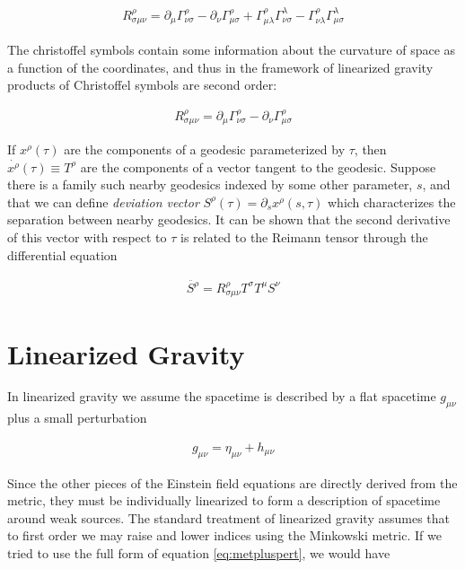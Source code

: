 \begin{align}
R^{\rho}_{\sigma \mu \nu} = \partial_{\mu}\Gamma^{\rho}_{\nu \sigma} - \partial_{\nu}\Gamma^{\rho}_{\mu \sigma} + \Gamma^{\rho}_{\mu \lambda}\Gamma^{\lambda}_{\nu \sigma} - \Gamma^{\rho}_{\nu \lambda}\Gamma^{\lambda}_{\mu \sigma}
\end{align}

The christoffel symbols contain some information about the curvature of space as a function of the coordinates, and thus in the framework of linearized gravity products of Christoffel symbols are second order:   

\begin{align}
R^{\rho}_{\sigma \mu \nu} = \partial_{\mu}\Gamma^{\rho}_{\nu \sigma} - \partial_{\nu}\Gamma^{\rho}_{\mu \sigma} 
\end{align}




If $x^{\rho}(\tau)$ are the components of a geodesic parameterized by $\tau$, then $\dot{x^{\rho}}(\tau) \equiv T^{\rho}$ are the components of a vector tangent to the geodesic. Suppose there is a family such nearby geodesics indexed by some other parameter, $s$, and that we can define \textit{deviation vector} $S^{\rho}(\tau) = \partial_{s}x^{\rho}(s,\tau)$ which characterizes the separation between nearby geodesics. It can be shown that the second derivative of this vector with respect to $\tau$ is related to the Reimann tensor through the differential equation
 

\begin{align}
\ddot{S^{\rho}} = R^{\rho}_{\sigma \mu \nu} T^{\sigma} T^{\mu} S^{\nu}
\end{align} 

\section{Linearized Gravity}

In linearized gravity we assume the spacetime is described by a flat spacetime $g_{\mu \nu}$ plus a small perturbation

\begin{align}\label{eq:metpluspert}
g_{\mu \nu} = \eta_{\mu \nu} + h_{\mu \nu}
\end{align}

Since the other pieces of the Einstein field equations are directly derived from the metric, they must be individually linearized to form a description of spacetime around weak sources. The standard treatment of linearized gravity assumes that to first order we may raise and lower indices using the Minkowski metric. If we tried to use the full form of equation \ref{eq:metpluspert}, we would have

